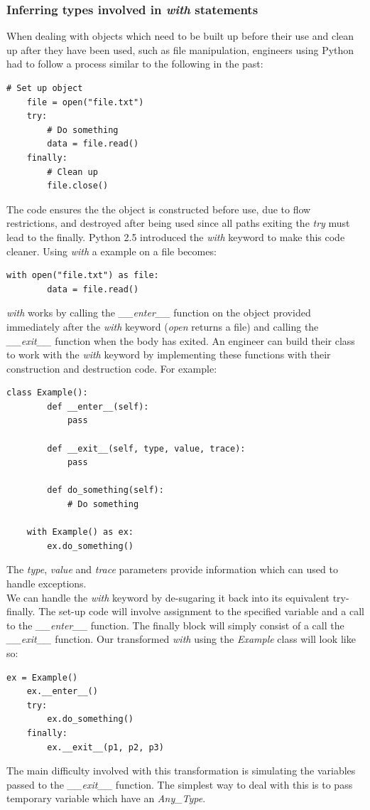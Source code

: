 \documentclass[12pt, titlepage]{article}
\begin{document}
\subsubsection{Inferring types involved in \textit{with} statements}
When dealing with objects which need to be built up before their use and clean up after they have been used, such as file manipulation, engineers using Python had to follow a process similar to the following in the past:
\begin{lstlisting}[mathescape]
	# Set up object
	file = open("file.txt")
	try:
		# Do something
		data = file.read()
	finally:
		# Clean up
		file.close()
\end{lstlisting}
The code ensures the the object is constructed before use, due to flow restrictions, and destroyed after being used since all paths exiting the \textit{try} must lead to the finally. Python 2.5 introduced the \textit{with} keyword to make this code cleaner. Using \textit{with} a example on a file becomes:
\begin{lstlisting}[mathescape]
	with open("file.txt") as file:
		data = file.read()
\end{lstlisting}
\textit{with} works by calling the \textit{\_\_enter\_\_} function on the object provided immediately after the \textit{with} keyword (\textit{open} returns a file) and calling the \textit{\_\_exit\_\_} function when the body has exited. An engineer can build their class to work with the \textit{with} keyword by implementing these functions with their construction and destruction code. For example:
\begin{lstlisting}[mathescape]
	class Example():
		def __enter__(self):
			pass
			
		def __exit__(self, type, value, trace):
			pass
			
		def do_something(self):
			# Do something
			
	with Example() as ex:
		ex.do_something()
\end{lstlisting}
The \textit{type}, \textit{value} and \textit{trace} parameters provide information which can used to handle exceptions. \\
We can handle the \textit{with} keyword by de-sugaring it back into its equivalent try-finally. The set-up code will involve assignment to the specified variable and a call to the \textit{\_\_enter\_\_} function. The finally block will simply consist of a call the \textit{\_\_exit\_\_} function. Our transformed \textit{with} using the \textit{Example} class will look like so:
\begin{lstlisting}[mathescape]
	ex = Example()
	ex.__enter__()
	try:
		ex.do_something()
	finally:
		ex.__exit__(p1, p2, p3)
\end{lstlisting}
The main difficulty involved with this transformation is simulating the variables passed to the \textit{\_\_exit\_\_} function. The simplest way to deal with this is to pass temporary variable which have an \textit{Any\_Type}.
{}

\end{document}
